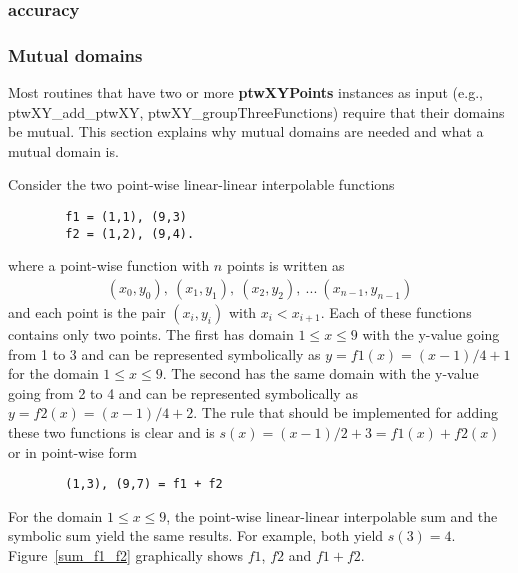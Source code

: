 \documentclass[11pt]{article}
\newcommand{\highlight}[1]{{\bf #1}}
\begin{document}
\subsubsection{accuracy}
\subsubsection{Mutual domains}
Most routines that have two or more \highlight{ptwXYPoints} instances as input (e.g., ptwXY\_add\_ptwXY, ptwXY\_groupThreeFunctions) require
that their domains be mutual. This section explains why mutual domains are needed and what a mutual domain is.

Consider the two point-wise linear-linear interpolable functions
\begin{verbatim}
        f1 = (1,1), (9,3)
        f2 = (1,2), (9,4).
\end{verbatim}
where a point-wise function with $n$ points is written as
\begin{eqnarray}
        (x_0,y_0), \ (x_1,y_1), \ (x_2,y_2), \ ... \ (x_{n-1},y_{n-1}) \nonumber
\end{eqnarray}
and each point is the pair $(x_i,y_i)$ with $x_i < x_{i+1}$.
Each of these functions contains only two points. The first has domain $1 \le x \le 9$ with the y-value 
going from 1 to 3 and can be represented symbolically as $y = f1(x) = ( x - 1 ) / 4 + 1$ for the domain $1 \le x \le 9$. 
The second has the same domain with the y-value going from 2 to 4 and can be represented symbolically as $y = f2(x) = ( x - 1 ) / 4 + 2$. 
The rule that should be implemented for adding these two functions is clear and is
$s(x) = ( x - 1 ) / 2 + 3 = f1(x) + f2(x)$ or in point-wise form
\begin{verbatim}
        (1,3), (9,7) = f1 + f2
\end{verbatim}
For the domain $1 \le x \le 9$, the point-wise linear-linear interpolable sum and the symbolic sum yield the
same results. For example, both yield $s(3) = 4$. Figure~\ref{sum_f1_f2} graphically shows $f1$, $f2$ and $f1 + f2$.

\end{document}
